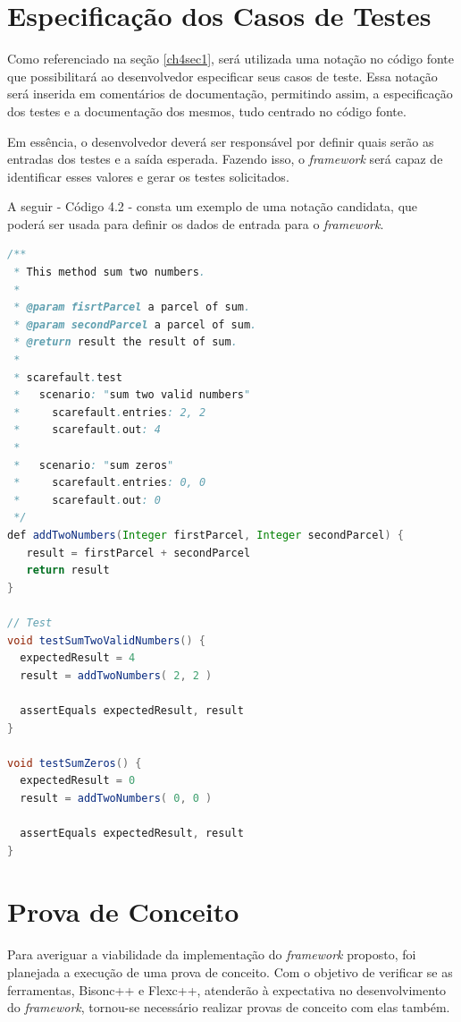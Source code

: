 \section{Especificação dos Casos de Testes}
Como referenciado na seção \ref{ch4sec1}, será utilizada uma notação no código
fonte que possibilitará ao desenvolvedor especificar seus casos de teste. Essa
notação será inserida em comentários de documentação, permitindo assim, a
especificação dos testes e a documentação dos mesmos, tudo centrado no código fonte.
\par
\indent Em essência, o desenvolvedor deverá ser responsável por definir quais
serão as entradas dos testes e a saída esperada. Fazendo isso, o \textit{framework}
será capaz de identificar esses valores e gerar os testes solicitados.
\par
\indent A seguir - Código 4.2 - consta um exemplo de uma notação candidata, que
poderá ser usada para definir os dados de entrada para o \textit{framework}.

\begin{lstlisting}[language=java, label=notacaoCandidata, caption={Notação Candidata}]
/**
 * This method sum two numbers.
 *
 * @param fisrtParcel a parcel of sum.
 * @param secondParcel a parcel of sum.
 * @return result the result of sum.
 *
 * scarefault.test
 *   scenario: "sum two valid numbers"
 *     scarefault.entries: 2, 2
 *     scarefault.out: 4
 *
 *   scenario: "sum zeros"
 *     scarefault.entries: 0, 0
 *     scarefault.out: 0
 */
def addTwoNumbers(Integer firstParcel, Integer secondParcel) {
   result = firstParcel + secondParcel
   return result
}

// Test
void testSumTwoValidNumbers() {
  expectedResult = 4
  result = addTwoNumbers( 2, 2 )

  assertEquals expectedResult, result
}

void testSumZeros() {
  expectedResult = 0
  result = addTwoNumbers( 0, 0 )

  assertEquals expectedResult, result
}
\end{lstlisting}

\section{Prova de Conceito}

Para averiguar a viabilidade da implementação do \textit{framework} proposto,
foi planejada a execução de uma prova de conceito. Com o objetivo de verificar
se as ferramentas, Bisonc++ e Flexc++, atenderão à expectativa no desenvolvimento
do \textit{framework}, tornou-se necessário realizar provas de conceito com elas
também.

